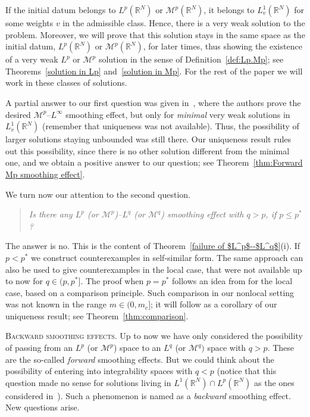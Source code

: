 \documentclass[leqno,12pt]{amsart}
\theoremstyle{definition}
\theoremstyle{remark}
\numberwithin{equation}{section}
\begin{document}
If the initial datum belongs to $L^p(\mathbb{R}^N)$ or $\mathcal{M}^p(\mathbb{R}^N)$, it belongs to $L^1_v(\mathbb{R}^N)$ for some weights $v$ in the admissible class. Hence, there is a very weak solution to the problem. Moreover, we will prove that this solution stays in the same space as the initial datum, $L^p(\mathbb{R}^N)$ or $\mathcal{M}^p(\mathbb{R}^N)$, for later times, thus showing the existence of a very weak $L^p$ or $\mathcal{M}^p$ solution in the sense of Definition~\ref{def:Lp.Mp}; see Theorems~\ref{solution in Lp} and~\ref{solution in Mp}. For the rest of the paper we will work in these classes of solutions. 

A partial answer to our first question was given in~\cite{vazquez:Mp_SE}, where the authors prove the desired $\mathcal{M}^p$--$L^\infty$ smoothing effect, but only for \emph{minimal} very weak solutions in $L^1_v(\mathbb{R}^N)$ (remember that uniqueness was not available). Thus, the possibility of larger solutions staying unbounded was still there. Our uniqueness result rules out this possibility, since there is no other solution different from the minimal one, and we obtain a positive answer to our question; see Theorem~\ref{thm:Forward Mp smoothing effect}.

We turn now our attention to the second question.
\begin{quote}
    \centering
    \emph{Is there any $L^p$ (or $\mathcal{M}^p$)--$L^q$ (or $\mathcal{M}^q$) smoothing effect with $q>p$, if $p\le p^*$?}  
\end{quote}
The answer is no. This is the content of Theorem~\ref{failure of $L^p$--$L^q$}(i). If $p<p^*$  we construct counterexamples in self-similar form. The same approach can also be used to give counterexamples in the local case, that were not available up to now for $q\in(p,p^*]$. The proof when $p= p^*$ follows an idea from \cite{chasvaz} for the local case, based on a comparison principle. Such comparison in our nonlocal setting was not known in the range $m\in(0,m_c]$; it will follow as a corollary of our uniqueness result; see Theorem~\ref{thm:comparison}.

\noindent\textsc{Backward smoothing effects. } Up to now we have only considered the possibility of passing from an $L^p$ (or $\mathcal{M}^p$) space to an $L^q$ (or $\mathcal{M}^q)$ space with $q>p$. These are the so-called \emph{forward} smoothing effects. But we could think about the possibility of entering into integrability spaces with $q<p$ (notice that this question made no sense for solutions living in $L^1(\mathbb{R}^N)\cap L^p(\mathbb{R}^N)$ as the ones considered in~\cite{b1}). Such a phenomenon is named as a \emph{backward} smoothing effect. New questions arise.
\end{document}
